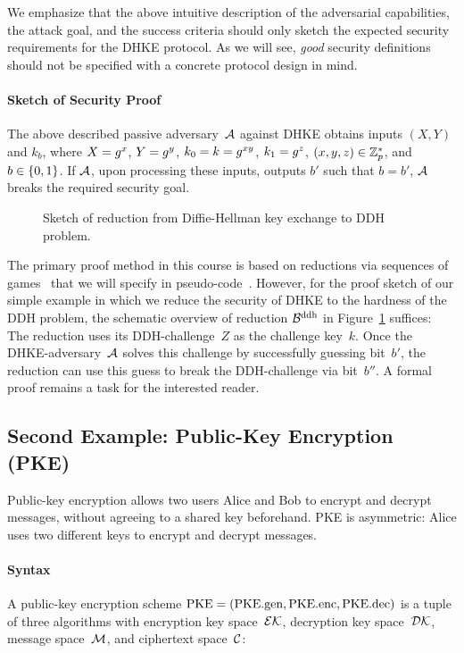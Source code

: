 We emphasize that the above intuitive description of the adversarial capabilities, the attack goal, and the success criteria should only sketch the expected security requirements for the DHKE protocol.
As we will see, \emph{good} security definitions should not be specified with a concrete protocol design in mind.

\paragraph{Sketch of Security Proof}
The above described passive adversary~$\mathcal{A}$ against DHKE obtains inputs $(X,Y)$ and $k_b$, where $X=g^x$, $Y=g^y$, $k_0=k=g^{xy}$, $k_1=g^z$, $(x,y,z)\in\mathbb{Z}_p^*$, and $b\in\{0,1\}$.
If $\mathcal{A}$, upon processing these inputs, outputs $b'$ such that $b=b'$, $\mathcal{A}$ breaks the required security goal.

\begin{figure}
    \centering
    
    \caption{Sketch of reduction from Diffie-Hellman key exchange to DDH problem.}
    \label{fig:dhke:reduction}
\end{figure}

The primary proof method in this course is based on reductions via sequences of games~\cite{EPRINT:Shoup04} that we will specify in pseudo-code~\cite{EC:BelRog06}.
However, for the proof sketch of our simple example in which we reduce the security of DHKE to the hardness of the DDH problem, the schematic overview of reduction $\mathcal{B}^{\mathrm{ddh}}$ in Figure~\ref{fig:dhke:reduction} suffices:
The reduction uses its DDH-challenge~$Z$ as the challenge key~$k$.
Once the DHKE-adversary~$\mathcal{A}$ solves this challenge by successfully guessing bit~$b'$, the reduction can use this guess to break the DDH-challenge via bit~$b''$.
A formal proof remains a task for the interested reader.

\subsection{Second Example: Public-Key Encryption (PKE)}
\label{sec:overview:pke}

Public-key encryption allows two users Alice and Bob to encrypt and decrypt messages, without agreeing to a shared key beforehand.
PKE is asymmetric: Alice uses two different keys to encrypt and decrypt messages.

\paragraph{Syntax}
A public-key encryption scheme $\mathrm{PKE}=(\mathrm{PKE}.\mathrm{gen},\mathrm{PKE}.\mathrm{enc},\mathrm{PKE}.\mathrm{dec})$ is a tuple of three algorithms with encryption key space~$\mathcal{EK}$, decryption key space~$\mathcal{DK}$, message space~$\mathcal{M}$, and ciphertext space~$\mathcal{C}$:

